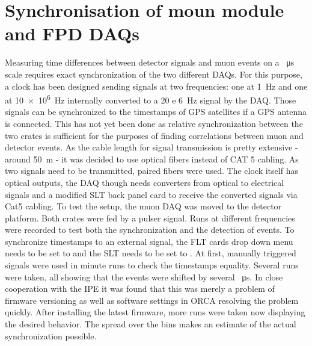  \section{Synchronisation of moun module and FPD DAQs}
  \label{ch:Analysis:sec:Synchronisation of moun module and FPD DAQs}
  Measuring time differences between detector signals and muon events on a \SI{}{\micro\second} scale requires exact synchronization of the two different DAQs. For this purpose, a clock has been designed sending signals at two frequencies: one at \SI{1}{\hertz} and one at \SI{10e6}{\hertz} internally converted to a \SI{20 e 6}{\hertz} signal by the DAQ. Those signals can be synchronized to the timestamps of GPS satellites if a GPS antenna is connected. This has not yet been done as relative synchronization between the two crates is sufficient for the purposes of finding correlations between muon and detector events. As the cable length for signal transmission is pretty extensive - around \SI{50}{\meter} - it was decided to use optical fibers instead of CAT 5 cabling. As two signals need to be transmitted, paired  fibers were used. The clock itself has optical outputs, the DAQ though needs converters from optical to electrical signals and a modified SLT back panel card to receive the converted 
  signals via Cat5 cabling.
  To test the setup, the muon DAQ was moved to the detector platform. Both crates were fed by a pulser signal. Runs at different frequencies were recorded to test both the synchronization and the detection of events. To synchronize timestamps to an external signal, the FLT cards drop down menu needs to be set to  and the SLT needs to be set to .
  At first, manually triggered signals were used in minute runs to check the timestamps equality. Several runs were taken, all showing that the events were shifted by several \SI{}{\micro\second}.
  In close cooperation with the IPE it was found that this was merely a problem of firmware versioning as well as software settings in ORCA resolving the problem quickly. After installing the latest firmware, more runs were taken now displaying the desired behavior.
  The spread over the bins makes an estimate of the actual synchronization possible. 

